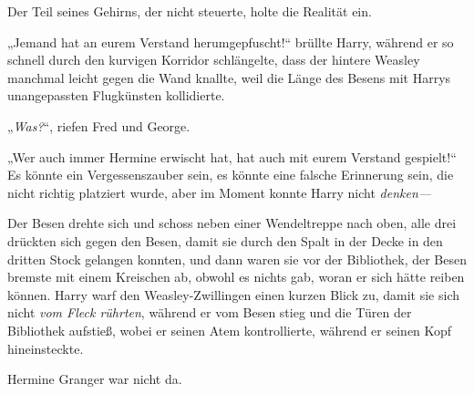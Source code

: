 Der Teil seines Gehirns, der nicht steuerte, holte die Realität ein.

„Jemand hat an eurem Verstand herumgepfuscht!“ brüllte Harry, während er so schnell durch den kurvigen Korridor schlängelte, dass der hintere Weasley manchmal leicht gegen die Wand knallte, weil die Länge des Besens mit Harrys unangepassten Flugkünsten kollidierte.

„\emph{Was?}“, riefen Fred und George.

„Wer auch immer Hermine erwischt hat, hat auch mit eurem Verstand gespielt!“ Es könnte ein Vergessenszauber sein, es könnte eine falsche Erinnerung sein, die nicht richtig platziert wurde, aber im Moment konnte Harry nicht \emph{denken—}

Der Besen drehte sich und schoss neben einer Wendeltreppe nach oben, alle drei drückten sich gegen den Besen, damit sie durch den Spalt in der Decke in den dritten Stock gelangen konnten, und dann waren sie vor der Bibliothek, der Besen bremste mit einem Kreischen ab, obwohl es nichts gab, woran er sich hätte reiben können. Harry warf den Weasley-Zwillingen einen kurzen Blick zu, damit sie sich nicht \emph{vom Fleck rührten}, während er vom Besen stieg und die Türen der Bibliothek aufstieß, wobei er seinen Atem kontrollierte, während er seinen Kopf hineinsteckte.

Hermine Granger war nicht da.

